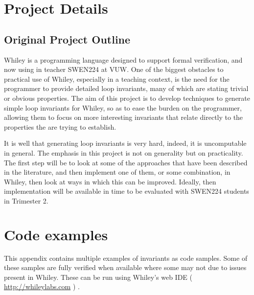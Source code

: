 \begin{appendices}

\chapter{Project Details}\label{A:proj-details}

\section{Original Project Outline}\label{A:proj-outline}

Whiley is a programming language designed to support formal verification, and now using in teacher SWEN224 at VUW.
One of the biggest obstacles to practical use of Whiley,
especially in a teaching context, is the need for  the programmer to provide detailed loop invariants,
many of which are stating trivial or obvious properties.
The aim of this project is to develop techniques to generate simple loop invariants for Whiley,
so as to ease the burden on the programmer,
allowing them to focus on more interesting invariants that relate directly to
the properties the are trying to establish.

It is well that generating loop invariants is very hard, indeed, it is uncomputable in general.
The emphasis in this project is not on generality but on practicality.
The first step will be to look at some of the approaches that have been described in the literature,
and then implement one of them, or some combination, in Whiley, then look at ways in which this can be improved.
Ideally, then implementation will be available in time to be evaluated with SWEN224 students in Trimester 2.

\chapter{Code examples}\label{A:code-examples}


This appendix contains multiple examples of invariants as code samples.
Some of these samples are fully verified when available where some may
not due to issues present in Whiley. 
These can be run using Whiley's web IDE ( \url{http://whileylabs.com} ) .



\end{appendices}
